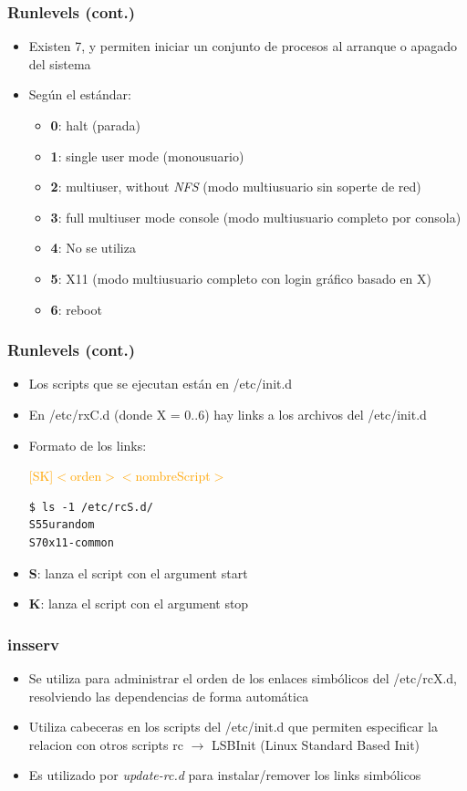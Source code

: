 \begin{frame}
  \frametitle{Runlevels (cont.)}
  \begin{itemize}
	  	\item Existen 7, y permiten iniciar un conjunto de procesos al arranque o apagado del sistema
	  	\item Según el estándar:
	  	\begin{itemize}
	  		\item \textbf{0}: halt (parada)
	  		\item \textbf{1}: single user mode (monousuario)
	  		\item \textbf{2}: multiuser, without \textit{NFS} (modo multiusuario sin soperte de red)
	  		\item \textbf{3}: full multiuser mode console (modo multiusuario completo por consola)
	  		\item \textbf{4}: No se utiliza
	  		\item \textbf{5}: X11 (modo multiusuario completo con login gráfico basado en X)
	  		\item \textbf{6}: reboot
	  	\end{itemize}	  	
  \end{itemize}
\end{frame}

\begin{frame}[fragile]
  \frametitle{Runlevels (cont.)}
  \begin{itemize}
	  	\item Los scripts que se ejecutan están en /etc/init.d
	  	\item En /etc/rxC.d (donde X = 0..6) hay links a los archivos del /etc/init.d
	  	\item Formato de los links:

	  	\textcolor{orange}{[S\textbar K]$<$orden$>$$<$nombreScript$>$}
		\begin{lstlisting}
$ ls -1 /etc/rcS.d/
S55urandom
S70x11-common
		\end{lstlisting}
		\item \textbf{S}: lanza el script con el argument start
		\item \textbf{K}: lanza el script con el argument stop
  \end{itemize}
\end{frame}

\begin{frame}
  \frametitle{\textbf{insserv}}
  \begin{itemize}
	  	\item Se utiliza para administrar el orden de los enlaces simbólicos del /etc/rcX.d, resolviendo las dependencias de forma automática
	  	\item Utiliza cabeceras en los scripts del /etc/init.d que permiten especificar la relacion con otros scripts rc $\rightarrow$ LSBInit (Linux Standard Based Init)
		\item Es utilizado por \textit{update-rc.d} para instalar/remover los links simbólicos
  \end{itemize}
\end{frame}


